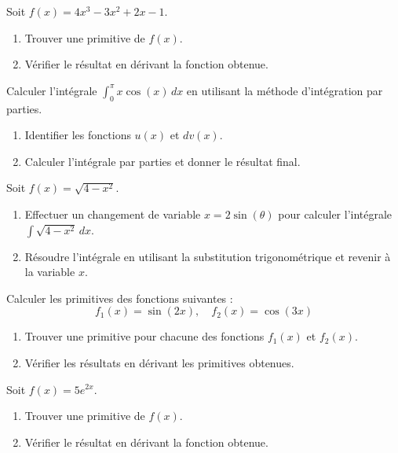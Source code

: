\begin{exercice}
Soit \( f(x) = 4x^3 - 3x^2 + 2x - 1 \).
\begin{enumerate}
    \item Trouver une primitive de \( f(x) \).
    \item Vérifier le résultat en dérivant la fonction obtenue.
\end{enumerate}
\end{exercice}

\begin{exercice}
Calculer l'intégrale \( \int_0^\pi x \cos(x) \, dx \) en utilisant la méthode d'intégration par parties.
\begin{enumerate}
    \item Identifier les fonctions \( u(x) \) et \( dv(x) \).
    \item Calculer l'intégrale par parties et donner le résultat final.
\end{enumerate}
\end{exercice}

\begin{exercice}
Soit \( f(x) = \sqrt{4 - x^2} \).
\begin{enumerate}
    \item Effectuer un changement de variable \( x = 2 \sin(\theta) \) pour calculer l'intégrale \( \int \sqrt{4 - x^2} \, dx \).
    \item Résoudre l'intégrale en utilisant la substitution trigonométrique et revenir à la variable \( x \).
\end{enumerate}
\end{exercice}

\begin{exercice}
Calculer les primitives des fonctions suivantes :
\[
f_1(x) = \sin(2x), \quad f_2(x) = \cos(3x)
\]
\begin{enumerate}
    \item Trouver une primitive pour chacune des fonctions \( f_1(x) \) et \( f_2(x) \).
    \item Vérifier les résultats en dérivant les primitives obtenues.
\end{enumerate}
\end{exercice}

\begin{exercice}
Soit \( f(x) = 5 e^{2x} \).
\begin{enumerate}
    \item Trouver une primitive de \( f(x) \).
    \item Vérifier le résultat en dérivant la fonction obtenue.
\end{enumerate}
\end{exercice}

